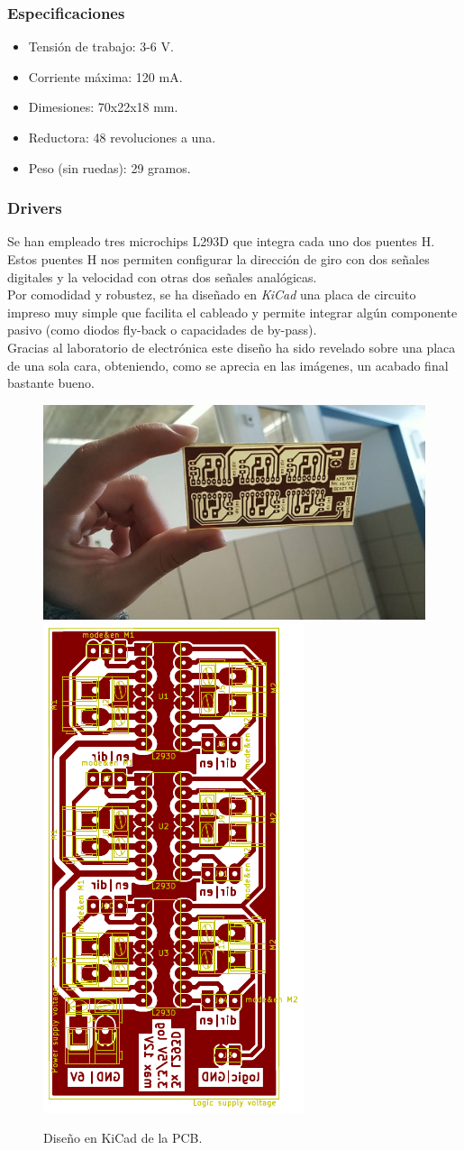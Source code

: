 \subsubsection{Especificaciones}
\begin{itemize}
	\item Tensión de trabajo: 3-6 V.
	\item Corriente máxima: 120 mA.
	\item Dimesiones: 70x22x18 mm.
	\item Reductora: 48 revoluciones a una.
	\item Peso (sin ruedas): 29 gramos.
\end{itemize}
\subsubsection{Drivers}
Se han empleado tres microchips L293D que integra cada uno dos puentes H. Estos puentes H nos permiten configurar la dirección de giro con dos señales digitales y la velocidad con otras dos señales analógicas.\\
Por comodidad y robustez, se ha diseñado en \textit{KiCad} una placa de circuito impreso muy simple que facilita el cableado y permite integrar algún 
componente pasivo (como diodos fly-back o capacidades de by-pass). \\
Gracias al laboratorio de electrónica este diseño ha sido revelado sobre una placa de una sola cara, obteniendo, como se aprecia en las imágenes, 
un acabado final bastante bueno.\\
 \begin{figure}[h!]
	 \centering
	 \includegraphics[width=.6\textwidth]{images/hw/pcb_img}
 	\includegraphics[width=.2\textwidth]{images/hw/pcb_kicad}
 	\caption{Diseño en KiCad de la PCB.}
 \end{figure}


